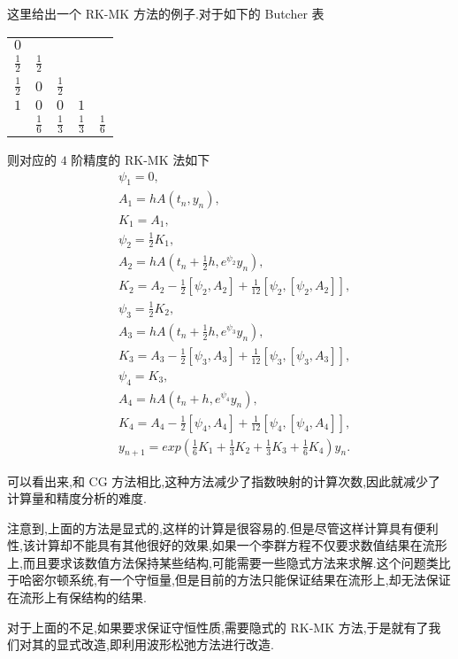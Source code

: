 这里给出一个 RK-MK 方法的例子.对于如下的 Butcher 表
\begin{center}
  \begin{tabular}{c|cccc}
    $0$&&&&\\
    $\frac{1}{2}$&$\frac{1}{2}$&&&\\
    $\frac{1}{2}$&$0$&$\frac{1}{2}$&&\\
    $1$&$0$&$0$&$1$&\\
    \hline
         &$\frac{1}{6}$&$\frac{1}{3}$&$\frac{1}{3}$&$\frac{1}{6}$
  \end{tabular}
\end{center}

则对应的 $4$ 阶精度的 RK-MK 法如下
\begin{equation*}
	\begin{aligned}
		&\psi_1=0,\\
		&A_1=hA(t_n,y_n),\\
		&K_1=A_1,\\
		&\psi_2=\frac{1}{2}K_1,\\
		&A_2=hA(t_n+\frac{1}{2}h,e^{\psi_2}y_n),\\
		&K_2=A_2-\frac{1}{2}[\psi_2,A_2]+\frac{1}{12}[\psi_2,[\psi_2,A_2]],\\
		&\psi_3=\frac{1}{2}K_2,\\
		&A_3=hA(t_n+\frac{1}{2}h,e^{\psi_3}y_n),\\
		&K_3=A_3-\frac{1}{2}[\psi_3,A_3]+\frac{1}{12}[\psi_3,[\psi_3,A_3]],\\
		&\psi_4=K_3,\\
		&A_4=hA(t_n+h,e^{\psi_4}y_n),\\
		&K_4=A_4-\frac{1}{2}[\psi_4,A_4]+\frac{1}{12}[\psi_4,[\psi_4,A_4]],\\
		&y_{n+1}=exp(\frac{1}{6}K_1+\frac{1}{3}K_2+\frac{1}{3}K_3+\frac{1}{6}K_4)y_n.
	\end{aligned}
\end{equation*}

可以看出来,和 CG 方法相比,这种方法减少了指数映射的计算次数,因此就减少了计算量和精度分析的难度.

注意到,上面的方法是显式的,这样的计算是很容易的.但是尽管这样计算具有便利性,该计算却不能具有其他很好的效果,如果一个李群方程不仅要求数值结果在流形上,而且要求该数值方法保持某些结构,可能需要一些隐式方法来求解.这个问题类比于哈密尔顿系统,有一个守恒量,但是目前的方法只能保证结果在流形上,却无法保证在流形上有保结构的结果.

对于上面的不足,如果要求保证守恒性质,需要隐式的 RK-MK 方法,于是就有了我们对其的显式改造,即利用波形松弛方法进行改造.

